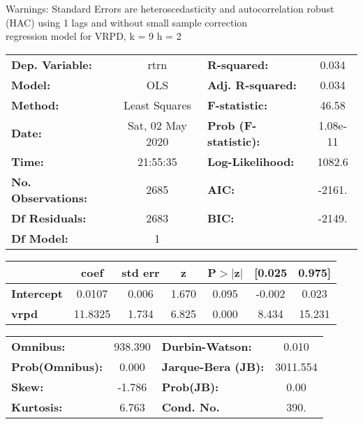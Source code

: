 Warnings: \newline
 [1] Standard Errors are heteroscedasticity and autocorrelation robust (HAC) using 1 lags and without small sample correction\\ 

regression model for VRPD, k = 9 h = 2\begin{center}
\begin{tabular}{lclc}
\toprule
\textbf{Dep. Variable:}    &       rtrn       & \textbf{  R-squared:         } &     0.034   \\
\textbf{Model:}            &       OLS        & \textbf{  Adj. R-squared:    } &     0.034   \\
\textbf{Method:}           &  Least Squares   & \textbf{  F-statistic:       } &     46.58   \\
\textbf{Date:}             & Sat, 02 May 2020 & \textbf{  Prob (F-statistic):} &  1.08e-11   \\
\textbf{Time:}             &     21:55:35     & \textbf{  Log-Likelihood:    } &    1082.6   \\
\textbf{No. Observations:} &        2685      & \textbf{  AIC:               } &    -2161.   \\
\textbf{Df Residuals:}     &        2683      & \textbf{  BIC:               } &    -2149.   \\
\textbf{Df Model:}         &           1      & \textbf{                     } &             \\
\bottomrule
\end{tabular}
\begin{tabular}{lcccccc}
                   & \textbf{coef} & \textbf{std err} & \textbf{z} & \textbf{P$> |$z$|$} & \textbf{[0.025} & \textbf{0.975]}  \\
\midrule
\textbf{Intercept} &       0.0107  &        0.006     &     1.670  &         0.095        &       -0.002    &        0.023     \\
\textbf{vrpd}      &      11.8325  &        1.734     &     6.825  &         0.000        &        8.434    &       15.231     \\
\bottomrule
\end{tabular}
\begin{tabular}{lclc}
\textbf{Omnibus:}       & 938.390 & \textbf{  Durbin-Watson:     } &    0.010  \\
\textbf{Prob(Omnibus):} &   0.000 & \textbf{  Jarque-Bera (JB):  } & 3011.554  \\
\textbf{Skew:}          &  -1.786 & \textbf{  Prob(JB):          } &     0.00  \\
\textbf{Kurtosis:}      &   6.763 & \textbf{  Cond. No.          } &     390.  \\
\bottomrule
\end{tabular}
\end{center}

